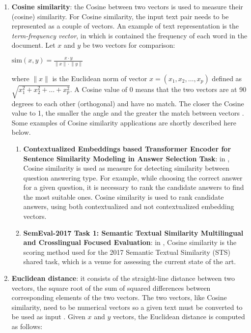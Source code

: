 \documentclass[\main/main.tex]{subfiles}
\begin{document}
\begin{enumerate}
    \item \textbf{Cosine similarity}: the Cosine between two vectors is used to measure their (cosine) similarity. For Cosine similarity, the input text pair needs to be represented as a couple of vectors. An example of text representation is the \emph{term-frequency vector}, in which is contained the frequency of each word in the document. Let $x$ and $y$ be two vectors for comparison:
    \begin{center}
        $\mathrm{sim}(x, y) = \frac{x \cdot y}{\lVert x \rVert \cdot \lVert y \rVert}$
    \end{center}
    where $\lVert x \rVert$ is the Euclidean norm of vector $x = (x_1, x_2,\dots, x_p)$ defined as \\$\sqrt{x^2_1 + x^2_2 + \dots + x^2_p}$. A Cosine value of 0 means that the two vectors are at 90 degrees to each other (orthogonal) and have no match. The closer the Cosine value to 1, the smaller the angle and the greater the match between vectors \cite{cosine_HAN201239} \cite{Gomaa2013ASO}. Some examples of Cosine similarity applications are shortly described here below.
    \begin{enumerate}
        \item \textbf{Contextualized Embeddings based Transformer Encoder for Sentence Similarity Modeling in Answer Selection Task}: in \cite{Laskar2020ContextualizedEB}, Cosine similarity is used as measure for detecting similarity between question answering type. For example, while choosing the correct answer for a given question, it is necessary to rank the candidate answers to find the most suitable ones. Cosine similarity is used to rank candidate answers, using both contextualized and not contextualized embedding vectors.
        \item \textbf{SemEval-2017 Task 1: Semantic Textual Similarity Multilingual and Crosslingual Focused Evaluation}: in \cite{Cer2017SemEval2017T1}, Cosine similarity is the scoring method used for the 2017 Semantic Textual Similarity (STS) shared task, which is a venue for assessing the current state of the art.
    \end{enumerate}
    \item \textbf{Euclidean distance}: it consists of the straight-line distance between two vectors, the square root of the sum of squared differences between corresponding elements of the two vectors. The two vectors, like Cosine similarity, need to be numerical vectors so a given text must be converted to be used as input \cite{Gomaa2013ASO}. Given $x$ and $y$ vectors, the Euclidean distance is computed as follows:

\end{enumerate}
\end{document}
